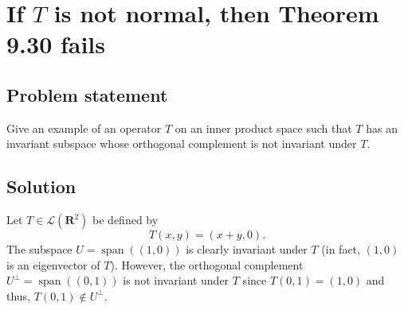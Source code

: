 \documentclass{article}
\begin{document}
\clearpage

\section{If $T$ is not normal, then Theorem 9.30 fails}
\subsection*{Problem statement}
Give an example of an operator $T$ on an inner product space such that $T$ has an invariant subspace whose orthogonal complement is not invariant under $T$.

\subsection*{Solution}
Let $T\in\mathcal{L}(\textbf{R}^2)$ be defined by 
\[T(x,y)=(x+y,0).\]
The subspace $U=\operatorname{span}((1,0))$ is clearly invariant under $T$ (in fact, $(1,0)$ is an eigenvector of $T$). However, the orthogonal complement $U^\bot=\operatorname{span}((0,1))$ is not invariant under $T$ since $T(0,1)=(1,0)$ and thus, $T(0,1)\notin U^\bot$.
\end{document}
